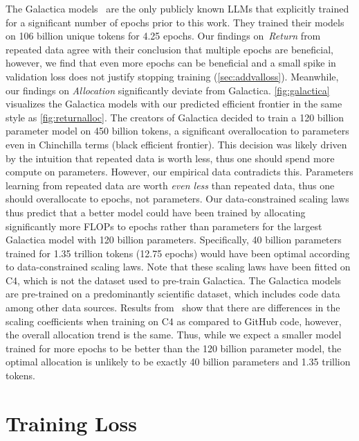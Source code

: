 \documentclass{article}
\begin{document}
The Galactica models~\cite{taylor2022galactica} are the only publicly known LLMs that explicitly trained for a significant number of epochs prior to this work. They trained their models on 106 billion unique tokens for 4.25 epochs. Our findings on~\emph{Return} from repeated data agree with their conclusion that multiple epochs are beneficial, however, we find that even more epochs can be beneficial and a small spike in validation loss does not justify stopping training (\autoref{sec:addvalloss}). Meanwhile, our findings on \emph{Allocation} significantly deviate from Galactica. \autoref{fig:galactica} visualizes the Galactica models with our predicted efficient frontier in the same style as \autoref{fig:returnalloc}. The creators of Galactica decided to train a 120 billion parameter model on 450 billion tokens, a significant overallocation to parameters even in Chinchilla terms (black efficient frontier). This decision was likely driven by the intuition that repeated data is worth less, thus one should spend more compute on parameters. However, our empirical data contradicts this. Parameters learning from repeated data are worth \emph{even less} than repeated data, thus one should overallocate to epochs, not parameters. Our data-constrained scaling laws thus predict that a better model could have been trained by allocating significantly more FLOPs to epochs rather than parameters for the largest Galactica model with 120 billion parameters. Specifically, 40 billion parameters trained for 1.35 trillion tokens (12.75 epochs) would have been optimal according to data-constrained scaling laws. Note that these scaling laws have been fitted on C4, which is not the dataset used to pre-train Galactica. The Galactica models are pre-trained on a predominantly scientific dataset, which includes code data among other data sources. Results from~\cite{hoffmann2022training} show that there are differences in the scaling coefficients when training on C4 as compared to GitHub code, however, the overall allocation trend is the same. Thus, while we expect a smaller model trained for more epochs to be better than the 120 billion parameter model, the optimal allocation is unlikely to be exactly 40 billion parameters and 1.35 trillion tokens.

\FloatBarrier

\section{Training Loss}
\label{sec:trainlossc4}
\end{document}
